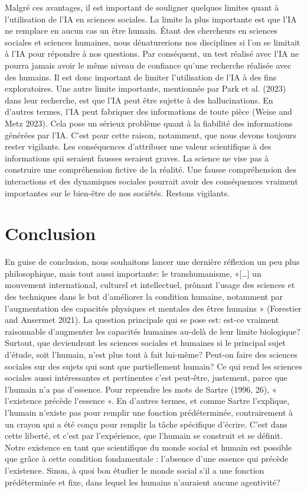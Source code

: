 \documentclass[
  letterpaper,
]{scrbook}
\begin{document}
Malgré ces avantages, il est important de souligner quelques limites
quant à l'utilisation de l'IA en sciences sociales. La limite la plus
importante est que l'IA ne remplace en aucun cas un être humain. Étant
des chercheurs en sciences sociales et sciences humaines, nous
dénaturerions nos disciplines si l'on se limitait à l'IA pour répondre à
nos questions. Par conséquent, un test réalisé avec l'IA ne pourra
jamais avoir le même niveau de confiance qu'une recherche réalisée avec
des humains. Il est donc important de limiter l'utilisation de l'IA à
des fins exploratoires. Une autre limite importante, mentionnée par Park
et al. (2023) dans leur recherche, est que l'IA peut être sujette à des
hallucinations. En d'autres termes, l'IA peut fabriquer des informations
de toute pièce (Weise and Metz 2023). Cela pose un sérieux problème
quant à la fiabilité des informations générées par l'IA. C'est pour
cette raison, notamment, que nous devons toujours rester vigilants. Les
conséquences d'attribuer une valeur scientifique à des informations qui
seraient fausses seraient graves. La science ne vise pas à construire
une compréhension fictive de la réalité. Une fausse compréhension des
interactions et des dynamiques sociales pourrait avoir des conséquences
vraiment importantes sur le bien-être de nos sociétés. Restons
vigilants.

\hypertarget{conclusion-5}{%
\section{Conclusion}\label{conclusion-5}}

En guise de conclusion, nous souhaitons lancer une dernière réflexion un
peu plus philosophique, mais tout aussi importante: le transhumanisme,
«{[}\ldots{]} un mouvement international, culturel et intellectuel,
prônant l'usage des sciences et des techniques dans le but d'améliorer
la condition humaine, notamment par l'augmentation des capacités
physiques et mentales des êtres humains » (Forestier and Ansermet 2021).
La question principale qui se pose est: est-ce vraiment raisonnable
d'augmenter les capacités humaines au-delà de leur limite biologique?
Surtout, que deviendront les sciences sociales et humaines si le
principal sujet d'étude, soit l'humain, n'est plus tout à fait lui-même?
Peut-on faire des sciences sociales sur des sujets qui sont que
partiellement humain? Ce qui rend les sciences sociales aussi
intéressantes et pertinentes c'est peut-être, justement, parce que
l'humain n'a pas d'essence. Pour reprendre les mots de Sartre (1996,
26), « l'existence précède l'essence ». En d'autres termes, et comme
Sartre l'explique, l'humain n'existe pas pour remplir une fonction
prédéterminée, contrairement à un crayon qui a été conçu pour remplir la
tâche spécifique d'écrire. C'est dans cette liberté, et c'est par
l'expérience, que l'humain se construit et se définit. Notre existence
en tant que scientifique du monde social et humain est possible que
grâce à cette condition fondamentale : l'absence d'une essence qui
précède l'existence. Sinon, à quoi bon étudier le monde social s'il a
une fonction prédéterminée et fixe, dans lequel les humains n'auraient
aucune agentivité?
\end{document}
